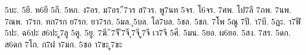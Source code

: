 {5บะ.
5ยี.
ห6ยี
5กี.
5หก.
ง7อร.
ม7อร.
ี7วร
ส7วร.
พู7นท
5จร.
โ6จร.
7ศพ.
โป7ลี
7ภพ.
7นพ.
7ณพ.
า7รก.
ทก7รก
ย7รก.
ยว7รก.
5มล.
ุ5บล.
โล7บล.
5ชล.
5ชก.
7โพ
5ณู
7ปี.
า7บี.
5ฏะ.
า7ฬี
5ปะ.
ฉ6ปะ
ส6ปะ
ู7ลู
5ตู.
5ยู.
7ฆี.
ิ7จี
ี7จี
ุ7จี
ู7จี
เว7จี
5ศี.
5มน.
5ยอ.
ผ6ยอ.
5สง.
7สร.
5ดก.
ส6ดก
7โก.
ก7ฝ
า7มก.
5ซอ
า7ขะ
ู7ขะ
}
